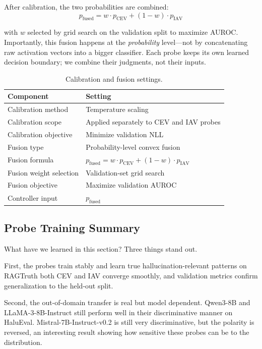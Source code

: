 After calibration, the two probabilities are combined:
\[
    p_{\text{fused}} = w \cdot p_{\text{CEV}} + (1 - w) \cdot p_{\text{IAV}}
\]

\noindent with $w$ selected by grid search on the validation split to maximize AUROC. Importantly, this fusion happens at the \emph{probability} level---not by concatenating raw activation vectors into a bigger classifier. Each probe keeps its own learned decision boundary; we combine their judgments, not their inputs.

\begin{table}[!htb]
\centering
\caption{Calibration and fusion settings.}
\label{tab:calibration_settings}
\begin{tabular}{@{}ll@{}}
\toprule
\textbf{Component} & \textbf{Setting} \\
\midrule
Calibration method        & Temperature scaling \\
Calibration scope         & Applied separately to CEV and IAV probes \\
Calibration objective     & Minimize validation NLL \\
Fusion type               & Probability-level convex fusion \\
Fusion formula            & $p_{\text{fused}} = w \cdot p_{\text{CEV}} + (1-w) \cdot p_{\text{IAV}}$ \\
Fusion weight selection   & Validation-set grid search \\
Fusion objective          & Maximize validation AUROC \\
Controller input          & $p_{\text{fused}}$ \\
\bottomrule
\end{tabular}
\end{table}

\newpage
\subsection{Probe Training Summary}
\label{sec:ch6_summary}

What have we learned in this section? Three things stand out.

First, the probes train stably and learn true hallucination-relevant patterns on RAGTruth both CEV and IAV converge smoothly, and validation metrics confirm generalization to the held-out split.

Second, the out-of-domain transfer is real but model dependent. Qwen3-8B and LLaMA-3-8B-Instruct still perform well in their discriminative manner on HaluEval. Mistral-7B-Instruct-v0.2 is still very discriminative, but the polarity is reversed, an interesting result showing how sensitive these probes can be to the distribution.

